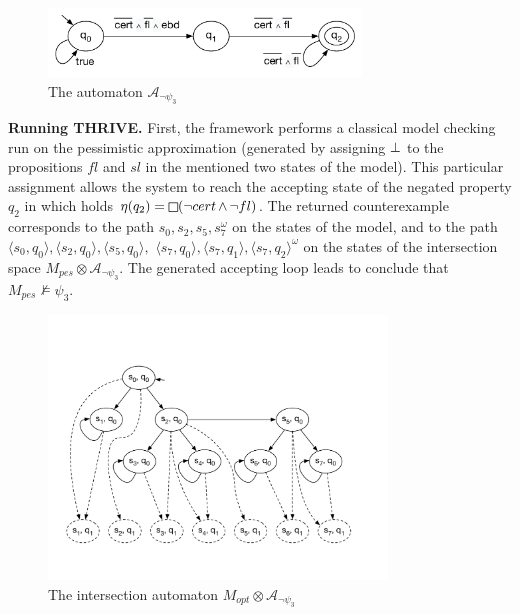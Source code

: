 \documentclass[runningheads,a4paper]{llncs}
\newcommand{\NAME}{THRIVE}
\begin{document}
\begin{figure}[h!]
\begin{center}         
\includegraphics[width=8.3cm]{./FiguresProof/Fig3.pdf}
\end{center}
\caption{The automaton $\mathcal{A}_{\lnot\psi_3}$}  
\label{fig:property}
\end{figure}

\vskip 0.05in  
\textbf{Running \NAME.}
First, the framework performs a classical model checking run on the pessimistic approximation (generated by assigning $\operatorname{\bot}$ to the propositions $fl$ and $sl$ in the mentioned two states of the model). This particular assignment allows the system to reach the accepting state of the negated property $q_2$ in which holds $\eta(q_2)=\LTLglobally(\lnot cert \LTLand \lnot fl)$. The returned counterexample corresponds to the path $s_0,s_2,s_5,s_7^{\omega}$ on the states of the model, and to the path  $\langle s_0,q_0\rangle,\langle s_2,q_0\rangle,\langle s_5,q_0\rangle,$ $\langle s_7,q_0\rangle,\langle s_7,q_1\rangle,\langle s_7,q_2\rangle^{\omega}$ on the states of the intersection space $M_{pes}\otimes\mathcal{A}_{\lnot\psi_3}$. The generated accepting loop leads to conclude that $M_{pes}\not\models \psi_3$. 



\begin{figure}[h!]
\begin{center}         
	\includegraphics[width=9cm]{./FiguresProof/Fig2.pdf}
\end{center}
\caption{The intersection automaton $M_{opt}\otimes\mathcal{A}_{\neg\psi_3}$}  
\label{fig:iopt}
\end{figure}
\end{document}
